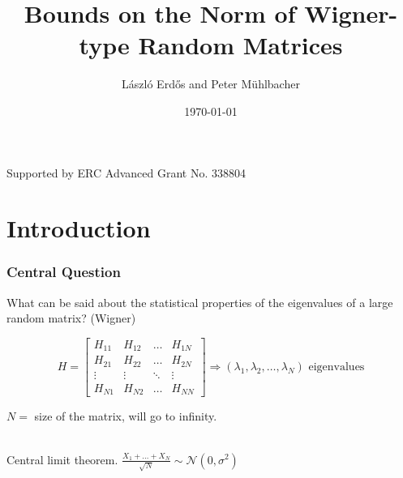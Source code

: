 \documentclass{beamer}
\title{Bounds on the Norm of Wigner-type Random Matrices}
\author{L\'aszl\'o Erd{\H{o}}s\inst{1} and Peter M{\"u}hlbacher\inst{1}}
\date{\today}
\institute[shortinst]{\inst{1} IST Austria}
\numberwithin{equation}{section}
\newcommand{\Cr}{\color{red}}
\renewcommand{\emph}[1]{{\Cr{#1}}}
\begin{document}
\begin{frame}
\titlepage
{\footnotesize Supported by ERC Advanced Grant No. 338804}
\end{frame}


\section{Introduction}
\begin{frame}
\frametitle{Central Question}
What can be said about the statistical properties of the eigenvalues of a large random matrix? (Wigner)

$$H=\begin{bmatrix}
    H_{11} & H_{12} & \dots  & H_{1N} \\
    H_{21} & H_{22} & \dots  & H_{2N} \\
    \vdots & \vdots & \ddots & \vdots \\
    H_{N1} & H_{N2} & \dots  & H_{NN}
\end{bmatrix} \Rightarrow (\lambda_1,\lambda_2,\dots,\lambda_N)\text{ eigenvalues}$$

$N =$ size of the matrix, will go to infinity.\\~

\emph{Analogy:} Central limit theorem. $\frac{X_1+\dots+X_N}{\sqrt N}\sim\mathcal N(0,\sigma^2)$ 
\end{frame}
\end{document}
